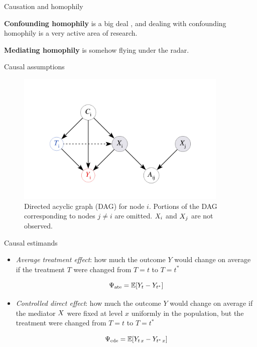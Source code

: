 \documentclass{beamer}
\theoremstyle{remark}
\begin{document}
\begin{frame}{Causation and homophily}

    \textbf{Confounding homophily} is a big deal \citep{shalizi_homophily_2011}, and dealing with confounding homophily is a very active area of research.

    \vspace{3mm}

    \textbf{Mediating homophily} is somehow flying under the radar.
\end{frame}

\begin{frame}{Causal assumptions}

    \centering

    \begin{figure}
        \includegraphics[width=0.9\textwidth]{figures/mediating.png}
        \caption{Directed acyclic graph (DAG) for node $i$. Portions of the DAG corresponding to nodes $j \neq i$ are omitted. $X_i$ and $X_j$ are not observed.}
        \label{fig:mediating}
    \end{figure}

\end{frame}

\begin{frame}{Causal estimands}

    \begin{itemize}
        \item \emph{Average treatment effect}: how much the outcome $Y$ would change on average if the treatment $T$ were changed from $T = t$ to $T = t^*$

              \begin{equation*}
                  \ate = \E{Y_t - Y_{t^*}}
              \end{equation*}

        \item \emph{Controlled direct effect}: how much the outcome $Y$ would change on average if the mediator $X$ were fixed at level $x$ uniformly in the population, but the treatment were changed from $T = t$ to $T = t^*$

              \begin{equation*}
                  \cde = \E{Y_{t \, x} - Y_{t^* \, x}}
              \end{equation*}

    \end{itemize}

\end{frame}
\end{document}
